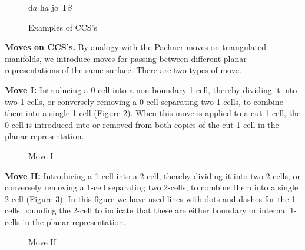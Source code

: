 \documentclass[a4paper,11pt]{article}
\begin{document}
\begin{figure}[htbp] 
\centerline{\relabelbox 
\epsfysize 2.3cm
\adjustrelabel <-1pt,0pt> {d}{$a$}
\adjustrelabel <0pt,1pt> {h}{$a$}
\adjustrelabel <-1pt,0pt> {j}{$a$}
\adjustrelabel <-1pt,0pt> {T}{$\beta$}
\endrelabelbox}
\caption{\label{fig:SDC} Examples of CCS's }
\end{figure}





{\bf Moves on CCS's.} By analogy with the Pachner moves on triangulated manifolds, we introduce moves for passing between different planar representations of the same surface. There are two types of move. 

\vskip 0.3cm

 

{\bf Move I:} Introducing a 0-cell into a non-boundary 1-cell, thereby dividing it into two 1-cells, or conversely removing a 0-cell separating two 1-cells, to combine them into a single 1-cell (Figure \ref{fig:move1}). When this move is applied to a cut 1-cell, the 0-cell is introduced into or removed from both copies of the cut 1-cell in the planar representation. 

\begin{figure}[htbp] 
\centerline{\relabelbox 
\epsfxsize 8cm
\endrelabelbox}
\caption{\label{fig:move1} Move I}
\end{figure}

{\bf Move II:} Introducing a 1-cell into a 2-cell, thereby dividing it into two 2-cells, or conversely removing a 1-cell separating two 2-cells, to combine them into a single 2-cell (Figure \ref{fig:move2}).
In this figure we have used lines with dots and dashes for the 1-cells bounding the 2-cell to indicate that these are either boundary or internal 1-cells in the planar representation.

\begin{figure}[htbp] 
\centerline{\relabelbox 
\epsfxsize 13cm
\endrelabelbox}
\caption{\label{fig:move2} Move II}
\end{figure}
\end{document}
